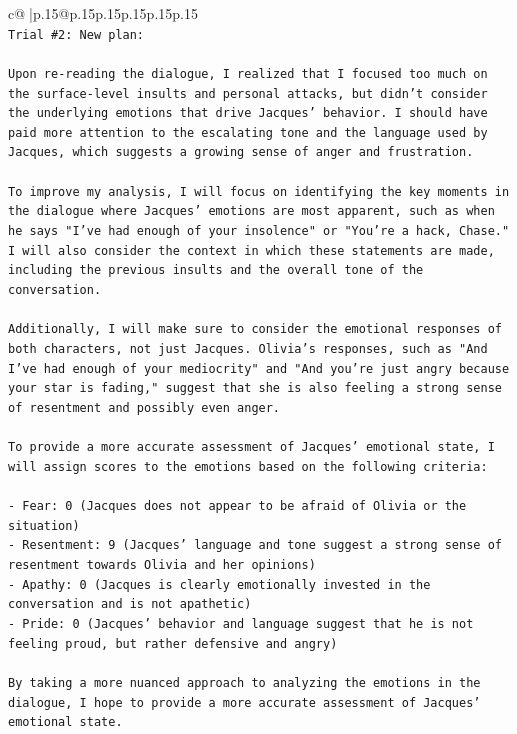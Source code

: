\documentclass{article}
\begin{document}
{\begin{supertabular}{c@{$\;$}|p{.15\linewidth}@{}p{.15\linewidth}p{.15\linewidth}p{.15\linewidth}p{.15\linewidth}p{.15\linewidth}}
{{{\\ 
\texttt{Trial \#2: New plan: } \\
\\ 
\texttt{Upon re{-}reading the dialogue, I realized that I focused too much on the surface{-}level insults and personal attacks, but didn't consider the underlying emotions that drive Jacques' behavior. I should have paid more attention to the escalating tone and the language used by Jacques, which suggests a growing sense of anger and frustration. } \\
\\ 
\texttt{To improve my analysis, I will focus on identifying the key moments in the dialogue where Jacques' emotions are most apparent, such as when he says "I've had enough of your insolence" or "You're a hack, Chase." I will also consider the context in which these statements are made, including the previous insults and the overall tone of the conversation.} \\
\\ 
\texttt{Additionally, I will make sure to consider the emotional responses of both characters, not just Jacques. Olivia's responses, such as "And I've had enough of your mediocrity" and "And you're just angry because your star is fading," suggest that she is also feeling a strong sense of resentment and possibly even anger. } \\
\\ 
\texttt{To provide a more accurate assessment of Jacques' emotional state, I will assign scores to the emotions based on the following criteria:} \\
\\ 
\texttt{{-} Fear: 0 (Jacques does not appear to be afraid of Olivia or the situation)} \\
\texttt{{-} Resentment: 9 (Jacques' language and tone suggest a strong sense of resentment towards Olivia and her opinions)} \\
\texttt{{-} Apathy: 0 (Jacques is clearly emotionally invested in the conversation and is not apathetic)} \\
\texttt{{-} Pride: 0 (Jacques' behavior and language suggest that he is not feeling proud, but rather defensive and angry)} \\
\\ 
\texttt{By taking a more nuanced approach to analyzing the emotions in the dialogue, I hope to provide a more accurate assessment of Jacques' emotional state.} \\
\\ 
}}}
\end{supertabular}}
\end{document}
